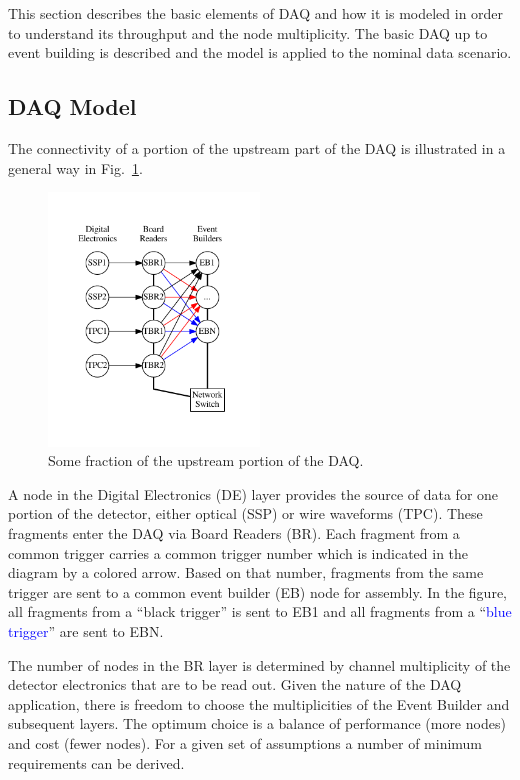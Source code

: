 \documentclass[pdftex,12pt,letter]{article}
\begin{document}
This section describes the basic elements of DAQ and how it is modeled in order to understand
its throughput and the node multiplicity.  The basic DAQ up to event
building is described and the model is applied to the nominal data
scenario.
\subsection{DAQ Model}
The connectivity of a portion of the upstream part of the DAQ is
illustrated in a general way in Fig.~\ref{fig:upstream}.
\begin{figure}[htbp]
  \centering
  \includegraphics[width=0.5\textwidth]{upstream.pdf}
  \caption{Some fraction of the upstream portion of the DAQ.}
  \label{fig:upstream}
\end{figure}
A node in
the Digital Electronics (DE) layer provides the source of data for one
portion of the detector, either optical (SSP) or wire waveforms (TPC).
These fragments enter the DAQ via Board Readers (BR).  Each fragment
from a common trigger carries a common trigger number which is
indicated in the diagram by a colored arrow.  Based on that number,
fragments from the same trigger are sent to a common event builder
(EB) node for assembly.  In the figure, all fragments from a ``black
trigger'' is sent to EB1 and all fragments from a
``\textcolor{blue}{blue trigger}'' are sent to EBN.

The number of nodes in the BR layer is determined by channel
multiplicity of the detector electronics that are to be read out.
Given the nature of the DAQ application, there is freedom to choose
the multiplicities of the Event Builder and subsequent layers.  The optimum choice is a balance of performance (more
nodes) and cost (fewer nodes).  For a given set of assumptions a
number of minimum requirements can be derived.
\end{document}
